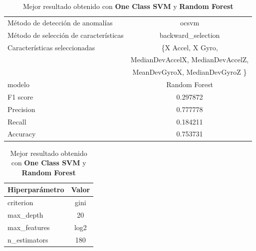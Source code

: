 \begin{appendices}
		\begin{table}[htb]
			\centering
			\caption{Mejor resultado obtenido con \textbf{One Class SVM} y \textbf{Random Forest}}
			\label{table:36}
			\begin{tabular}{lc}
				\toprule
					  Método de detección de anomalías &                                              ocsvm \\
				Método de selección de características &                                 backward\_selection \\
						 Características seleccionadas & \{X Accel, X Gyro, \\
						                               &   MedianDevAccelX, MedianDevAccelZ, \\
						                               &  MeanDevGyroX, MedianDevGyroZ \}\\
												modelo &                                      Random Forest \\
											  F1 score &                                           0.297872 \\
											 Precision &                                           0.777778 \\
												Recall &                                           0.184211 \\
											  Accuracy &                                           0.753731 \\
				\bottomrule
			\end{tabular}
			\newline
			\newline

			\begin{tabular}{lc}
				\toprule
				Hiperparámetro & Valor \\
				\midrule
					 criterion &  gini \\
					 max\_depth &    20 \\
				  max\_features &  log2 \\
				  n\_estimators &   180 \\
				\bottomrule
			\end{tabular}
			
		\end{table}

\end{appendices}
